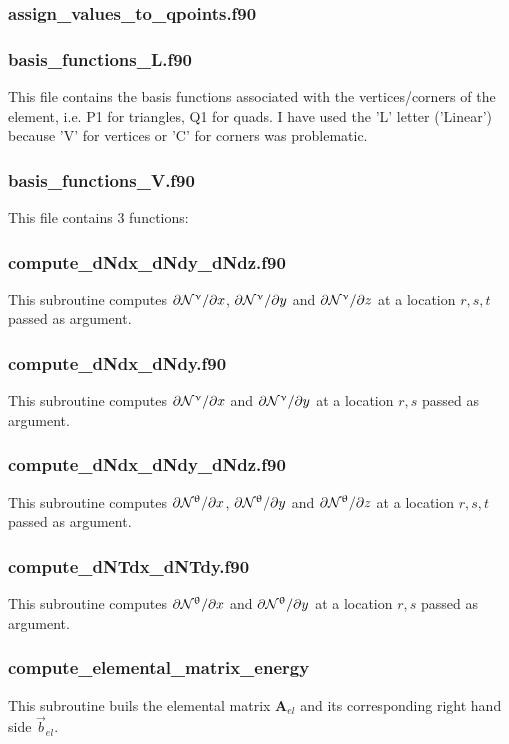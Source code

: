  \subsubsection{assign\_values\_to\_qpoints.f90}

 \subsubsection{basis\_functions\_L.f90}
 This file contains the basis functions associated with the vertices/corners
 of the element, i.e. P1 for triangles, Q1 for quads. 
 I have used the 'L' letter ('Linear') because 'V' for vertices or 'C' for 
 corners was problematic.
 \subsubsection{basis\_functions\_V.f90}
 This file contains 3 functions: 
 \subsubsection{compute\_dNdx\_dNdy\_dNdz.f90}
 This subroutine computes $\partial{{\mathcal{N}}^\upnu}/\partial x$, $\partial{{\mathcal{N}}^\upnu}/\partial y$ and
 $\partial{{\mathcal{N}}^\upnu}/\partial z$ at a location $r,s,t$ passed as argument.
 \subsubsection{compute\_dNdx\_dNdy.f90}
 This subroutine computes $\partial{{\mathcal{N}}^\upnu}/\partial x$ and $\partial{{\mathcal{N}}^\upnu}/\partial y$
 at a location $r,s$ passed as argument.
 \subsubsection{compute\_dNdx\_dNdy\_dNdz.f90}
 This subroutine computes $\partial{{\mathcal{N}}^\uptheta}/\partial x$, 
 $\partial{{\mathcal{N}}^\uptheta}/\partial y$ and
 $\partial{{\mathcal{N}}^\uptheta}/\partial z$ at a location $r,s,t$ passed as argument.
 \subsubsection{compute\_dNTdx\_dNTdy.f90}
 This subroutine computes $\partial{{\mathcal{N}}^\uptheta}/\partial x$ 
 and $\partial{{\mathcal{N}}^\uptheta}/\partial y$  at a location $r,s$ passed as argument.
 \subsubsection{compute\_elemental\_matrix\_energy}
 This subroutine buils the elemental matrix ${\bm A}_{el}$ and its corresponding 
 right hand side $\vec{b}_{el}$. 
